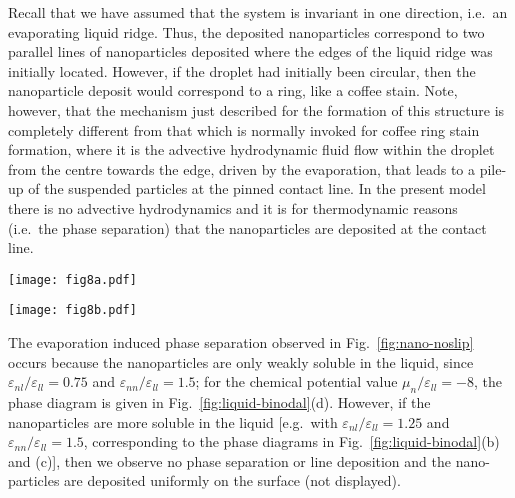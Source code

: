 \documentclass[journal=langd5,manuscript=article]{achemso}
\def\e{\varepsilon}
\begin{document}
Recall that we have assumed that the system is invariant in one direction, i.e.\ an evaporating liquid ridge. Thus, the deposited nanoparticles correspond to two parallel lines of nanoparticles deposited where the edges of the liquid ridge was initially located. However, if the droplet had initially been circular, then the nanoparticle deposit would correspond to a ring, like a coffee stain. Note, however, that the mechanism just described for the formation of this structure is completely different from that which is normally invoked for coffee ring stain formation, where it is the advective hydrodynamic fluid flow within the droplet from the centre towards the edge, driven by the evaporation, that leads to a pile-up of the suspended particles at the pinned contact line. In the present model there is no advective hydrodynamics and it is for thermodynamic reasons (i.e.\ the phase separation) that the nanoparticles are deposited at the contact line.

\begin{figure*}[t]
\texttt{[image: fig8a.pdf]}

\texttt{[image: fig8b.pdf]}

\caption{%
Top: Snapshots during the evaporation of a droplet of nanoparticle suspension from a surface with $\e_{wl}/\e_{ll} = 0.8$,
  $\e_{ln}/\e_{ll} = 0.75$, $\e_{nn}/\e_{ll} = 1.5$ and $k_BT/\e_{ll} =
  1.3$, $s=0$ and $v=0.005$ in a $256\times128$ system. In each pair of density profiles, the solvent is on the left and the nanoparticle density profile is on the right. {Bottom: Magnification in the contact line region of the nanoparticle density profile for the time $t=2.98\times 10^4$.}
}
\label{fig:nano-noslip}
\end{figure*}

{The evaporation induced phase separation observed in Fig.~\ref{fig:nano-noslip} occurs because the nanoparticles are only weakly soluble in the liquid, since $\e_{nl}/\e_{ll}=0.75$ and $\e_{nn}/\e_{ll}=1.5$; for the chemical potential value $\mu_n/\e_{ll}=-8$, the phase diagram is given in Fig.~\ref{fig:liquid-binodal}(d). However, if the nanoparticles are more soluble in the liquid [e.g.\ with $\e_{nl}/\e_{ll}=1.25$ and $\e_{nn}/\e_{ll}=1.5$, corresponding to the phase diagrams in Fig.~\ref{fig:liquid-binodal}(b) and (c)], then we observe no phase separation or line deposition and the nano-particles are deposited uniformly on the surface (not displayed).}
\end{document}
